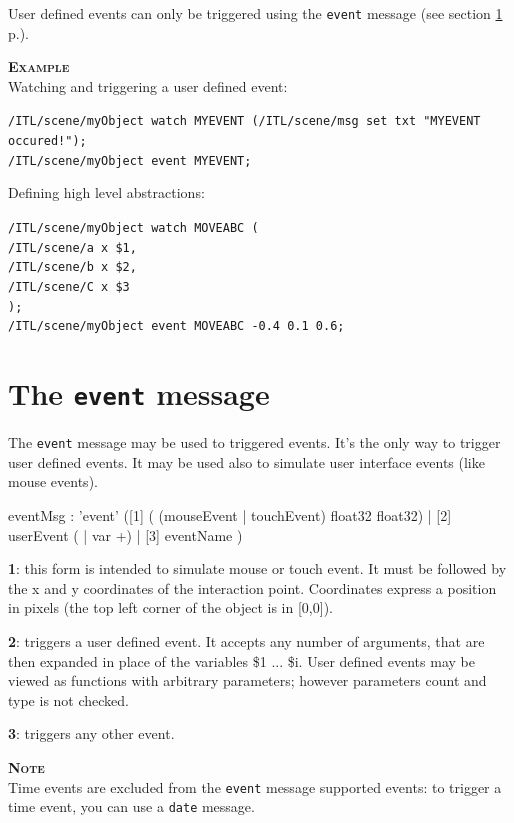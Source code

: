 \documentclass[a4paper,twoside]{report}
\newcommand{\sublevel}[1]	{\section{#1}}
\newcommand{\fullref}[1]	{\ref{#1} p.\pageref{#1}}
\newcommand{\OSC}[1]		{\texttt{#1}}
\newcommand{\example}		{\textbf{\hspace{-1.5cm}\textbf{\textsc{Example }}}}
\newcommand{\note}	[1]		{\vspace{2mm}\textbf{\hspace{-0.9cm}\textbf{\textsc{Note #1}}}}
\let\olditemize\itemize
\let\oldenditemize\enditemize
\renewenvironment{itemize} 	{\olditemize \setlength{\itemsep}{1mm}}{\oldenditemize}
\newcommand{\sample}	[1]			{\vspace{-2mm}\begin{center}\colorbox{mygrey}{
								\begin{minipage}[t]{0.9\columnwidth} 
								{\small \texttt{#1}}
								\end{minipage}}\end{center}}
\begin{document}
User defined events can only be triggered using the \OSC{event} message (see section \fullref{eventMsg}).

\example \\
Watching and triggering a user defined event:
\sample{/ITL/scene/myObject watch MYEVENT (/ITL/scene/msg set txt "MYEVENT occured!");\\
/ITL/scene/myObject event MYEVENT;
}

Defining high level abstractions:
\sample{/ITL/scene/myObject watch MOVEABC ( \\
\hspace*{1cm}/ITL/scene/a x \$1,\\
\hspace*{1cm}/ITL/scene/b x \$2,\\
\hspace*{1cm}/ITL/scene/C x \$3\\
); \\
/ITL/scene/myObject event MOVEABC -0.4 0.1 0.6;
}


\sublevel{The \OSC{event} message}
\label{eventMsg}

The \OSC{event} message may be used to triggered events. It's the only way to trigger user defined events. 
It may be used also to simulate user interface events (like mouse events).

\begin{rail}
eventMsg :  'event' 
			([1] ( (mouseEvent | touchEvent) float32 float32) 
			| [2] userEvent ( | var +)
			| [3] eventName
			)
\end{rail}


\begin{itemize}
\item \textbf{1}: this form is intended to simulate mouse or touch event. It must be followed by the x and y coordinates of the interaction point. Coordinates express a position in pixels (the top left corner of the object is in [0,0]).
\item \textbf{2}: triggers a user defined event. It accepts any number of arguments, that are then expanded in place of the variables \$1 ... \$i. User defined events may be viewed as functions with arbitrary parameters; however parameters count and type is not checked. 
\item \textbf{3}: triggers any other event. 
\end{itemize}

\note \\
Time events are excluded from the \OSC{event} message supported events: to trigger a time event, you can use a \OSC{date} message.
\end{document}
